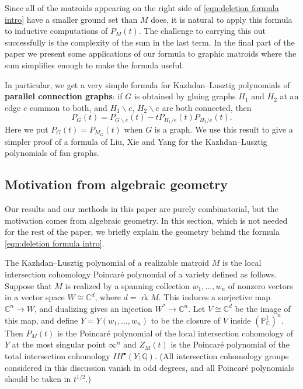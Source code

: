 \documentclass[12pt,reqno]{amsart}
\theoremstyle{definition}
\theoremstyle{remark}
\newcommand{\rk}{\operatorname{rk}}
\newcommand{\C}{{\mathbb{C}}}
\newcommand{\Q}{{\mathbb{Q}}}
\newcommand{\IH}{I\! H}
\renewcommand{\(}{\left(}
\renewcommand{\)}{\right)}
\newcommand{\<}{\left<}
\renewcommand{\>}{\right>}
\renewcommand{\setminus}{\smallsetminus}
\begin{document}
Since all of the matroids appearing on the right side of \eqref{eqn:deletion formula intro} have a smaller ground set than $M$ does, it is natural to apply this formula to inductive computations of $P_M(t)$.  The challenge to carrying this out successfully is the complexity of the sum in the last term.  In the final part of the paper we present some applications of our formula to graphic matroids where the sum simplifies enough to make the formula useful.  


In particular, we get a very simple formula for Kazhdan--Lusztig polynomials of \textbf{parallel connection graphs}: if $G$ is obtained by gluing graphs $H_1$ and $H_2$ at an edge $e$ common to both, and $H_1 \setminus e$, $H_2 \setminus e$ are both connected, then 
\[P_G(t) = P_{G \setminus e}(t) - tP_{H_1/e}(t)P_{H_2/e}(t).\]
Here we put $P_G(t) = P_{M_G}(t)$ when $G$ is a graph.
We use this result to give a simpler proof of a formula of Liu, Xie and Yang \cite{LXY} for the Kazhdan--Lusztig polynomials of fan graphs.




\subsection{Motivation from algebraic geometry}

Our results and our methods in this paper are purely combinatorial, but the motivation comes from algebraic geometry.  In this section, which is not needed for the rest of the paper, we briefly explain the geometry behind the formula \eqref{eqn:deletion formula intro}.
 
The Kazhdan--Lusztig polynomial of a realizable matroid $M$ is the local intersection cohomology Poincar\'e polynomial of a variety defined as follows.  Suppose that $M$ is realized by a spanning collection $w_1, \dots, w_{n}$ of nonzero vectors in a vector space $W \cong \C^{d}$, where $d = \rk M$.  This induces a surjective 
map $\C^{n} \to W$, and dualizing gives an injection $W^* \to \C^{n}$.  Let $V\cong \C^d$ be the image of this map, and define $Y = Y(w_1,\dots, w_n)$ to be the closure of $V$ inside $(\mathbb P^1_\C)^n$.  Then
$P_M(t)$ is the Poincar\'e polynomial  of the local intersection cohomology of $Y$ at the most singular point $\infty^n$ and $Z_M(t)$ is the Poincar\'e polynomial  of the total intersection cohomology $\IH^{\bullet}(Y ;\Q)$.  (All intersection cohomology groups considered in this discussion vanish in odd degrees, and all Poincar\'e polynomials should be taken in $t^{1/2}$.)
\end{document}
